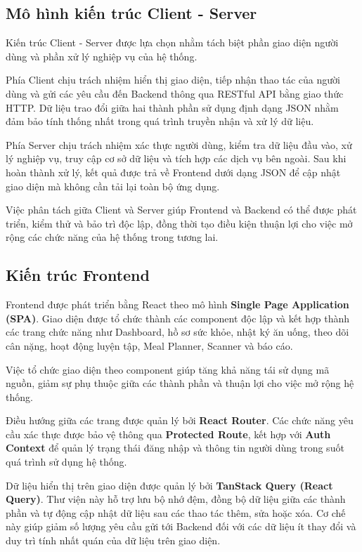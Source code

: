 \documentclass[12pt, a4paper]{report}
\begin{document}
\subsection{Mô hình kiến trúc Client - Server}Kiến trúc Client - Server được lựa chọn nhằm tách biệt phần giao diện người dùng và phần xử lý nghiệp vụ của hệ thống.

Phía Client chịu trách nhiệm hiển thị giao diện, tiếp nhận thao tác của người dùng và gửi các yêu cầu đến Backend thông qua RESTful API bằng giao thức HTTP. Dữ liệu trao đổi giữa hai thành phần sử dụng định dạng JSON nhằm đảm bảo tính thống nhất trong quá trình truyền nhận và xử lý dữ liệu.

Phía Server chịu trách nhiệm xác thực người dùng, kiểm tra dữ liệu đầu vào, xử lý nghiệp vụ, truy cập cơ sở dữ liệu và tích hợp các dịch vụ bên ngoài. Sau khi hoàn thành xử lý, kết quả được trả về Frontend dưới dạng JSON để cập nhật giao diện mà không cần tải lại toàn bộ ứng dụng.

Việc phân tách giữa Client và Server giúp Frontend và Backend có thể được phát triển, kiểm thử và bảo trì độc lập, đồng thời tạo điều kiện thuận lợi cho việc mở rộng các chức năng của hệ thống trong tương lai.

\subsection{Kiến trúc Frontend}Frontend được phát triển bằng React theo mô hình \textbf{Single Page Application (SPA)}. Giao diện được tổ chức thành các component độc lập và kết hợp thành các trang chức năng như Dashboard, hồ sơ sức khỏe, nhật ký ăn uống, theo dõi cân nặng, hoạt động luyện tập, Meal Planner, Scanner và báo cáo.

Việc tổ chức giao diện theo component giúp tăng khả năng tái sử dụng mã nguồn, giảm sự phụ thuộc giữa các thành phần và thuận lợi cho việc mở rộng hệ thống.

Điều hướng giữa các trang được quản lý bởi \textbf{React Router}. Các chức năng yêu cầu xác thực được bảo vệ thông qua \textbf{Protected Route}, kết hợp với \textbf{Auth Context} để quản lý trạng thái đăng nhập và thông tin người dùng trong suốt quá trình sử dụng hệ thống.

Dữ liệu hiển thị trên giao diện được quản lý bởi \textbf{TanStack Query (React Query)}. Thư viện này hỗ trợ lưu bộ nhớ đệm, đồng bộ dữ liệu giữa các thành phần và tự động cập nhật dữ liệu sau các thao tác thêm, sửa hoặc xóa. Cơ chế này giúp giảm số lượng yêu cầu gửi tới Backend đối với các dữ liệu ít thay đổi và duy trì tính nhất quán của dữ liệu trên giao diện.
\end{document}
